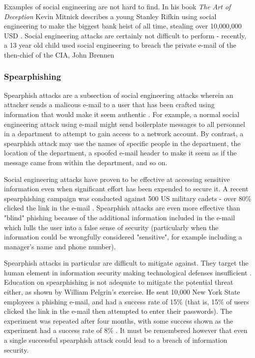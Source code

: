 \documentclass[12pt]{article}
\begin{document}
Examples of social engineering are not hard to find. In his book \textit{The Art of Deception} Kevin Mitnick describes a young Stanley Rifkin using social engineering to make the biggest bank heist of all time, stealing over 10,000,000 USD \citep{mitnick}. Social engineering attacks are certainly not difficult to perform - recently, a 13 year old child used social engineering to breach the private e-mail of the then-chief of the CIA, John Brennen \citep{cia13yearold}

\subsubsection{Spearphishing}
Spearphish attacks are a subsection of social engineering attacks wherein an attacker sends a malicous e-mail to a user that has been crafted using information that would make it seem authentic \citep{spearphishing}. For example, a normal social engineering attack using e-mail might send boilerplate messages to all personnel in a department to attempt to gain access to a network account. By contrast, a spearphish attack may use the names of specific people in the department, the location of the department, a spoofed e-mail header to make it seem as if the message came from within the department, and so on.

Social engineering attacks have proven to be effective at accessing sensitive information even when significant effort has been expended to secure it. A recent spearphishing campaign was conducted against 500 US military cadets - over 80\% clicked the link in the e-mail \citep{spearphishing}. Spearphish attacks are even more effective than "blind" phishing because of the additional information included in the e-mail which lulls the user into a false sense of security (particularly when the information could be wrongfully considered "sensitive", for example including a manager's name and phone number).

Spearphish attacks in particular are difficult to mitigate against. They target the human element in information security making technological defenses insufficient \citep{spearphishing}. Education on spearphishing is not adequate to mitigate the potential threat either, as shown by William Pelgrin's exercise. He sent 10,000 New York State employees a phishing e-mail, and had a success rate of 15\% (that is, 15\% of users clicked the link in the e-mail then attempted to enter their passwords). The experiment was repeated after four months, with some success shown as the experiment had a success rate of 8\% \citep{spearphishingresults}. It must be remembered however that even a single successful spearphish attack could lead to a breach of information security.
\end{document}

